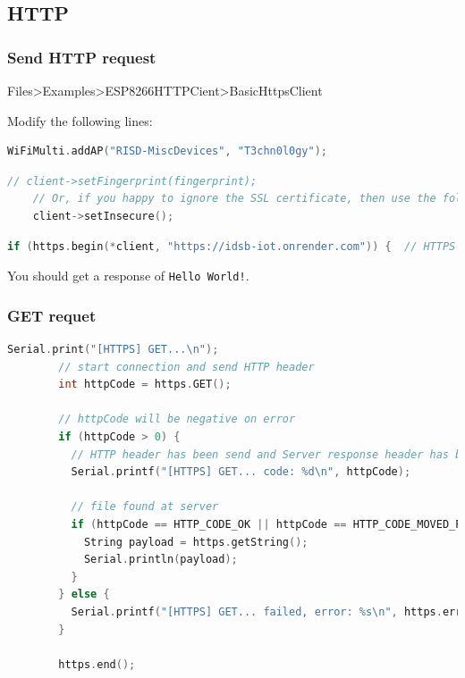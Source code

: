 \documentclass[compress, aspectratio=32]{beamer}
\begin{document}
\subsection{HTTP}
\begin{frame}[fragile]
    \frametitle{Send HTTP request}
    Files>Examples>ESP8266HTTPCient>BasicHttpsClient
    \par Modify the following lines:

    \begin{lstlisting}[language=c, firstnumber=37]
    WiFiMulti.addAP("RISD-MiscDevices", "T3chn0l0gy");
    \end{lstlisting}
    
    \begin{lstlisting}[language=c, firstnumber=46]
    // client->setFingerprint(fingerprint);
    // Or, if you happy to ignore the SSL certificate, then use the following line instead:
    client->setInsecure();
    \end{lstlisting}

    \begin{lstlisting}[language=c, firstnumber=53]
    if (https.begin(*client, "https://idsb-iot.onrender.com")) {  // HTTPS
    \end{lstlisting}

    You should get a response of \verb|Hello World!|.
\end{frame}

\begin{frame}[fragile]
    \frametitle{GET requet}
    \begin{lstlisting}[language=c, firstnumber=55, basicstyle=\ttfamily\tiny]
        Serial.print("[HTTPS] GET...\n");
        // start connection and send HTTP header
        int httpCode = https.GET();
  
        // httpCode will be negative on error
        if (httpCode > 0) {
          // HTTP header has been send and Server response header has been handled
          Serial.printf("[HTTPS] GET... code: %d\n", httpCode);
  
          // file found at server
          if (httpCode == HTTP_CODE_OK || httpCode == HTTP_CODE_MOVED_PERMANENTLY) {
            String payload = https.getString();
            Serial.println(payload);
          }
        } else {
          Serial.printf("[HTTPS] GET... failed, error: %s\n", https.errorToString(httpCode).c_str());
        }
  
        https.end();
    \end{lstlisting}
\end{frame}
\end{document}
